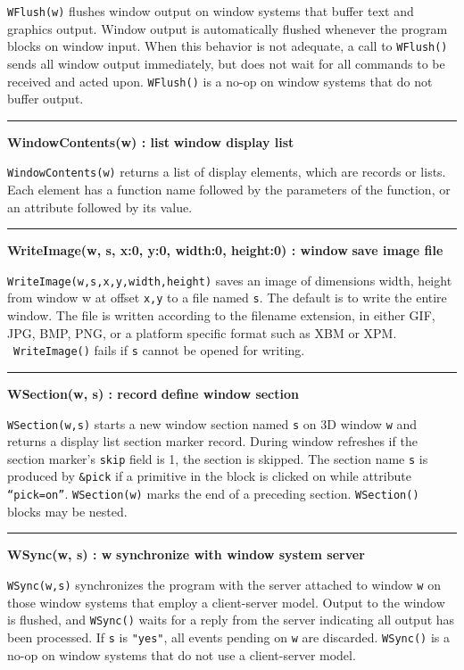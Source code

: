 \noindent
\texttt{WFlush(w)} flushes window output on window systems that buffer
text and graphics output. Window output is automatically flushed
whenever the program blocks on window input. When this behavior is
not adequate, a call to \texttt{WFlush()} sends all window output
immediately, but does not wait for all commands to be received and
acted upon. \texttt{WFlush()} is a no-op on window systems that do not
buffer output.

\bigskip\hrule\vspace{0.1cm}
\noindent
{\bf WindowContents(w) : list } \hfill {\bf window display list}

\noindent
\texttt{WindowContents(w)} returns a list of display elements, which are
records or lists. Each element has a function name followed by the
parameters of the function, or an attribute followed by its value.

\bigskip\hrule\vspace{0.1cm}
\noindent
{\bf WriteImage(w, s, x:0, y:0, width:0, height:0) : window } \hfill {\bf save image file}

\noindent
\texttt{WriteImage(w,s,x,y,width,height)} saves an image of dimensions
width, height from window w at offset \texttt{x,y} to a file named
\texttt{s}. The default is to write the entire window. The file
is written according to the filename extension, in either GIF, JPG,
BMP, PNG, or a platform specific format such as XBM or XPM.
\ \texttt{WriteImage()} fails if \texttt{s} cannot be opened for
writing.

\bigskip\hrule\vspace{0.1cm}
\noindent
{\bf WSection(w, s) : record} \hfill {\bf define window section}

\noindent
\texttt{WSection(w,s)} starts a new window section named \texttt{s} on
3D window \texttt{w} and returns a display list section marker record.
During window refreshes if the section marker's
\texttt{skip} field is 1, the section is skipped. The section name
\texttt{s} is produced by \texttt{\&pick} if a primitive in the block
is clicked on while attribute
\texttt{{\textquotedblleft}pick=on{\textquotedblright}}.
\texttt{WSection(w)} marks the end of a preceding section.
\texttt{WSection()} blocks may be nested.

\bigskip\hrule\vspace{0.1cm}
\noindent
{\bf WSync(w, s) : w} \hfill {\bf synchronize with window system server}

\noindent
\texttt{WSync(w,s)} synchronizes the program with the server attached to
window \texttt{w} on those window systems that employ a client-server
model. Output to the window is flushed, and \texttt{WSync()} waits
for a reply from the server indicating all output has been processed.
If \texttt{s} is \texttt{"yes"}, all
events pending on \texttt{w} are discarded. \texttt{WSync()} is a no-op
on window systems that do not use a client-server model.

